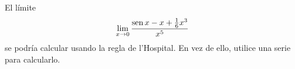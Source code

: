 \item El límite
    \[ \lim_{x \to 0} \frac{\operatorname{sen} x - x + \frac{1}{6}x^3}{x^5} \]
    se podría calcular usando la regla de l'Hospital. En vez de ello, utilice una serie para calcularlo.
